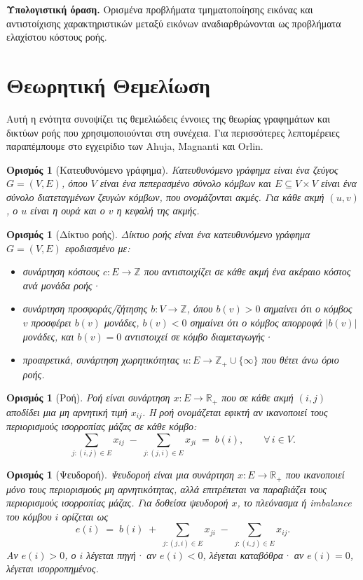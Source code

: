 \documentclass[11pt,a4paper,oneside]{report}
\newtheorem{definition}[theorem]{Ορισμός}
\begin{document}
\textbf{Υπολογιστική όραση.} Ορισμένα προβλήματα τμηματοποίησης εικόνας και αντιστοίχισης χαρακτηριστικών μεταξύ εικόνων αναδιαρθρώνονται ως προβλήματα ελαχίστου κόστους ροής.

\section{Θεωρητική Θεμελίωση}

Αυτή η ενότητα συνοψίζει τις θεμελιώδεις έννοιες της θεωρίας γραφημάτων και δικτύων ροής που χρησιμοποιούνται στη συνέχεια. Για περισσότερες λεπτομέρειες παραπέμπουμε στο εγχειρίδιο των \textenglish{Ahuja}, \textenglish{Magnanti} και \textenglish{Orlin}.

\begin{definition}[Κατευθυνόμενο γράφημα]
Κατευθυνόμενο γράφημα είναι ένα ζεύγος $G=(V,E)$, όπου $V$ είναι ένα πεπερασμένο σύνολο κόμβων και $E \subseteq V \times V$ είναι ένα σύνολο διατεταγμένων ζευγών κόμβων, που ονομάζονται ακμές. Για κάθε ακμή $(u,v)$, ο $u$ είναι η ουρά και ο $v$ η κεφαλή της ακμής.
\end{definition}

\begin{definition}[Δίκτυο ροής]
Δίκτυο ροής είναι ένα κατευθυνόμενο γράφημα $G=(V,E)$ εφοδιασμένο με:
\begin{itemize}
  \item συνάρτηση κόστους $c: E \to \mathbb{Z}$ που αντιστοιχίζει σε κάθε ακμή ένα ακέραιο κόστος ανά μονάδα ροής·
  \item συνάρτηση προσφοράς/ζήτησης $b: V \to \mathbb{Z}$, όπου $b(v)>0$ σημαίνει ότι ο κόμβος $v$ προσφέρει $b(v)$ μονάδες, $b(v)<0$ σημαίνει ότι ο κόμβος απορροφά $|b(v)|$ μονάδες, και $b(v)=0$ αντιστοιχεί σε κόμβο διαμεταγωγής·
  \item προαιρετικά, συνάρτηση χωρητικότητας $u: E \to \mathbb{Z}_{+} \cup \{\infty\}$ που θέτει άνω όριο ροής.
\end{itemize}
\end{definition}

\begin{definition}[Ροή]
Ροή είναι συνάρτηση $x: E \to \mathbb{R}_{+}$ που σε κάθε ακμή $(i,j)$ αποδίδει μια μη αρνητική τιμή $x_{ij}$. Η ροή ονομάζεται \emph{εφικτή} αν ικανοποιεί τους περιορισμούς ισορροπίας μάζας σε κάθε κόμβο:
\[
\sum_{j:(i,j)\in E} x_{ij} \;-\; \sum_{j:(j,i)\in E} x_{ji} \;=\; b(i), \qquad \forall\, i \in V.
\]
\end{definition}

\begin{definition}[Ψευδοροή]
Ψευδοροή είναι μια συνάρτηση $x: E \to \mathbb{R}_{+}$ που ικανοποιεί μόνο τους περιορισμούς μη αρνητικότητας, αλλά επιτρέπεται να παραβιάζει τους περιορισμούς ισορροπίας μάζας. Για δοθείσα ψευδοροή $x$, το \emph{πλεόνασμα} ή \emph{\textenglish{imbalance}} του κόμβου $i$ ορίζεται ως
\[
e(i) \;=\; b(i) \;+\; \sum_{j:(j,i)\in E} x_{ji} \;-\; \sum_{j:(i,j)\in E} x_{ij}.
\]
Αν $e(i) > 0$, ο $i$ λέγεται \emph{πηγή}· αν $e(i) < 0$, λέγεται \emph{καταβόθρα}· αν $e(i) = 0$, λέγεται \emph{ισορροπημένος}.
\end{definition}
\end{document}
